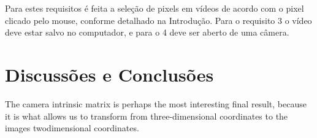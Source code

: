 \documentclass{bmvc2k}
\begin{document}
Para estes requisitos é feita a seleção de pixels em vídeos de acordo com o pixel clicado pelo mouse, conforme detalhado na Introdução. Para o requisito 3 o vídeo deve estar salvo no computador, e para o 4 deve ser aberto de uma câmera.

\section{Discussões e Conclusões}
\label{sec:Conclusion}
The camera intrinsic matrix is perhaps the most interesting final result, because it is
what allows us to transform from three-dimensional coordinates to the images twodimensional coordinates.


\end{document}
